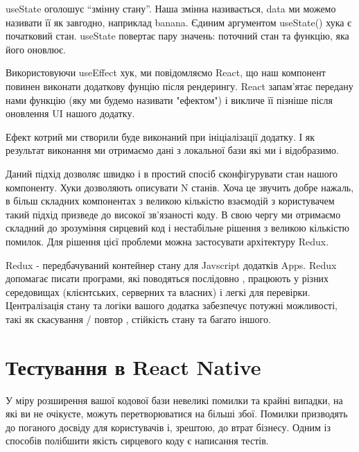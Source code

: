 \begin{enumerate}
    \begin{item}
        useState оголошує “змінну стану”.
        Наша змінна називається, data ми можемо називати її як завгодно, наприклад banana.
        Єдиним аргументом useState() хука є початковий стан.
        useState повертає пару значень: поточний стан та функцію, яка його оновлює.
    \end{item}
    \begin{item}
        Використовуючи useEffect хук, ми повідомляємо React, що наш компонент повинен виконати додаткову фунцію після рендерингу.
        React запам'ятає передану нами функцію (яку ми будемо називати "ефектом") і викличе її пізніше після оновлення UI нашого додатку.
    \end{item}
    \begin{item}
        Ефект котрий ми створили буде виконаний при ініціалізації додатку.
        І як результат виконання ми отримаємо дані з локальної бази які ми і відобразимо.
    \end{item}
\end{enumerate}

Даний підхід дозволяє швидко і в простий спосіб сконфігурувати стан нашого компоненту.
Хуки дозволяють описувати N станів.
Хоча це звучить добре нажаль, в більш складних компонентах з великою кількістю взаємодій з користувачем такий підхід призведе до високої зв'язаності коду.
В свою чергу ми отримаємо складний до зрозуміння сирцевий код і нестабільне рішення з великою кількістю помилок.
Для рішення цієї проблеми можна застосувати архітектуру Redux.

Redux - передбачуваний контейнер стану для Javscript додатків Apps.
Redux допомагає писати програми, які поводяться послідовно , працюють у різних середовищах (клієнтських, серверних та власних) і легкі для перевірки. \cite{redux_home_page}
Централізація стану та логіки вашого додатка забезпечує потужні можливості, такі як скасування / повтор , стійкість стану та багато іншого. \cite{redux_home_page}


\section{Тестування в React Native}
\label{section.2.9}
У міру розширення вашої кодової бази невеликі помилки та крайні випадки, на які ви не очікуєте, можуть перетворюватися на більші збої.
Помилки призводять до поганого досвіду для користувачів і, зрештою, до втрат бізнесу.
Одним із способів полібшити якість сирцевого коду є написання тестів.

